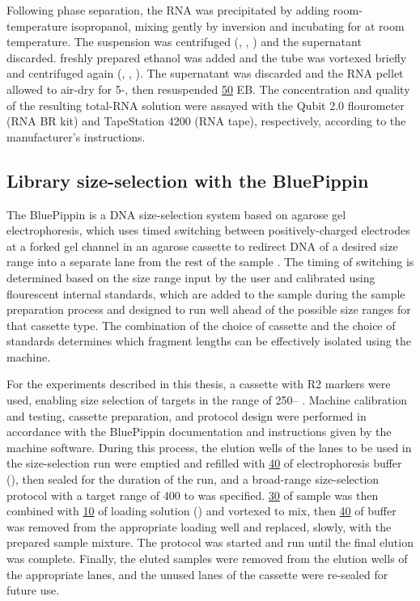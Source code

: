 Following phase separation, the RNA was precipitated by adding  room-temperature isopropanol, mixing gently by inversion and incubating for  at room temperature. The suspension was centrifuged (, , ) and the supernatant discarded.  freshly prepared  ethanol was added and the tube was vortexed briefly and centrifuged again (, , ). The supernatant was discarded and the RNA pellet allowed to air-dry for 5-, then resuspended \ul{50} EB. The concentration and quality of the resulting total-RNA solution were assayed with the Qubit 2.0 flourometer (RNA BR kit) and TapeStation 4200 (RNA tape), respectively, according to the manufacturer's instructions.


\subsection{Library size-selection with the BluePippin}
\label{sec:methods_molec_standard_bluepippin}

The BluePippin is a DNA size-selection system based on agarose gel electrophoresis, which uses timed switching between positively-charged electrodes at a forked gel channel in an agarose cassette to redirect DNA of a desired size range into a separate lane from the rest of the sample \parencite{sage2016bluepippin}. The timing of switching is determined based on the size range input by the user and calibrated using flourescent internal standards, which are added to the sample during the sample preparation process and designed to run well ahead of the possible size ranges for that cassette type. The combination of the choice of cassette and the choice of standards determines which fragment lengths can be effectively isolated using the machine.

For the experiments described in this thesis, a  cassette with R2 markers were used, enabling size selection of targets in the range of 250-- \parencite{sage2016bluepippin}. Machine calibration and testing, cassette preparation, and protocol design were performed in accordance with the BluePippin documentation and instructions given by the machine software. During this process, the elution wells of the lanes to be used in the size-selection run were emptied and refilled with \ul{40} of electrophoresis buffer (), then sealed for the duration of the run, and a broad-range size-selection protocol with a target range of 400 to  was specified. \ul{30} of sample was then combined with \ul{10} of loading solution () and vortexed to mix, then \ul{40} of buffer was removed from the appropriate loading well and replaced, slowly, with the prepared sample mixture. The protocol was started and run until the final elution was complete. Finally, the eluted samples were removed from the elution wells of the appropriate lanes, and the unused lanes of the cassette were re-sealed for future use.

